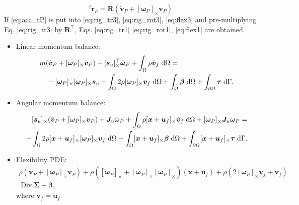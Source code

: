 \documentclass{svjour3}                     %
\DeclareMathOperator*{\Div}{Div}
\newcommand{\crmat}[1]{\ensuremath{[#1]_{\times}}}
\begin{document}
\begin{equation}
\label{eq:acc_rP}
^{i}\ddot{\bm{r}}_P = \bm{R} \left(\dot{\bm{v}}_P + \crmat{\bm{\omega}_P} \bm{v}_P \right)
\end{equation}
If \eqref{eq:acc_rP} is put into \eqref{eq:rig_tr3}, \eqref{eq:rig_rot3}, \eqref{eq:flex3} and pre-multiplying  Eq. \eqref{eq:rig_tr3} by $\bm{R}^\top$, Eqs. \eqref{eq:rig_tr1} \eqref{eq:rig_rot1}, \eqref{eq:flex1} are obtained.
\begin{itemize}
\item Linear momentum balance:
\begin{equation}
\label{eq:rig_tr4}
\begin{split}
&m (\dot{\bm{v}}_P + \crmat{\bm{\omega}_P} \bm{v}_P) + \crmat{\bm{s}_u}^\top \dot{\bm{\omega}}_P  + \int_{\Omega} \rho \dot{\bm{v}}_f \d{\Omega} = \\
&\quad - \crmat{\bm{\omega}_P} \crmat{\bm{\omega}_P} \bm{s}_u - \int_{\Omega} 2 \rho \crmat{\bm{\omega}_P} {\bm{v}}_f \d{\Omega} +  \int_{\Omega} \bm\beta \d{\Omega} + \int_{\partial \Omega} \bm\tau \d{\Gamma}.
\end{split}
\end{equation}
\item Angular momentum balance:
\begin{equation}
\label{eq:rig_rot4}
\begin{split}
\crmat{\bm{s}_u} (\dot{\bm{v}}_P + \crmat{\bm{\omega}_P} \bm{v}_P) + \bm{J}_u \dot{\bm\omega}_P + \int_{\Omega} \rho \crmat{\bm{x}+\bm{u}_f} \dot{\bm{v}}_f \d{\Omega} + \crmat{\bm{\omega}_P} \bm{J}_u \bm{\omega}_P = \\ 
- \int_{\Omega} 2\rho \crmat{\bm{x}+\bm{u}_f} \crmat{\bm\omega_P} {\bm{v}}_f \d{\Omega} + \int_{\Omega}\crmat{\bm{x}+\bm{u}_f} \bm\beta \d{\Omega} + \int_{\partial \Omega}\crmat{\bm{x}+\bm{u}_f} \bm\tau \d{\Gamma}. \\
\end{split}
\end{equation}
\item Flexibility PDE:
\begin{equation}
\label{eq:flex4}
\begin{split}
\rho (\dot{\bm{v}}_P + \crmat{\bm\omega_P} \bm{v}_P) + \rho (\crmat{\dot{\bm\omega}_P} + \crmat{\bm{\omega}_P}\crmat{\bm{\omega}_P})(\bm{x}+\bm{u}_f) + \rho (2 \crmat{\bm{\omega}_P} {\bm{v}}_f + \dot{\bm{v}}_f) = \\
\Div{\bm\Sigma} + \bm\beta,
\end{split}
\end{equation}
where $\bm{v}_f = \dot{\bm{u}}_f$.
\end{itemize}
\end{document}
